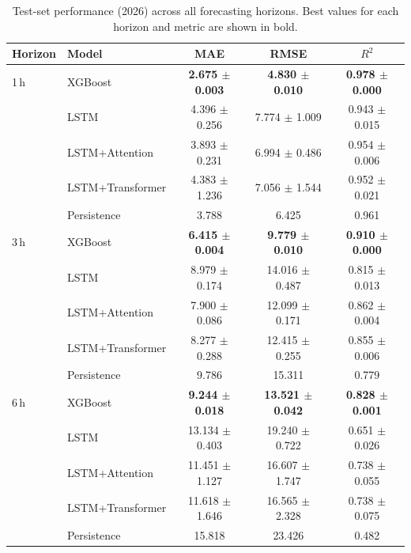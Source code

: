 \documentclass[conference]{IEEEtran}
\begin{document}
\begin{table}[t]
\caption{Test-set performance (2026) across all forecasting horizons. Best values for each horizon and metric are shown in bold.}
\label{tab:main}
\centering
\footnotesize
\setlength{\tabcolsep}{5pt}
\begin{tabular}{llccc}
\toprule
Horizon & Model & MAE & RMSE & \(R^2\) \\
\midrule

1\,h & XGBoost &
\textbf{2.675 \(\pm\) 0.003} &
\textbf{4.830 \(\pm\) 0.010} &
\textbf{0.978 \(\pm\) 0.000} \\

& LSTM &
4.396 \(\pm\) 0.256 &
7.774 \(\pm\) 1.009 &
0.943 \(\pm\) 0.015 \\

& LSTM+Attention &
3.893 \(\pm\) 0.231 &
6.994 \(\pm\) 0.486 &
0.954 \(\pm\) 0.006 \\

& LSTM+Transformer &
4.383 \(\pm\) 1.236 &
7.056 \(\pm\) 1.544 &
0.952 \(\pm\) 0.021 \\

& Persistence &
3.788 & 6.425 & 0.961 \\

\midrule

3\,h & XGBoost &
\textbf{6.415 \(\pm\) 0.004} &
\textbf{9.779 \(\pm\) 0.010} &
\textbf{0.910 \(\pm\) 0.000} \\

& LSTM &
8.979 \(\pm\) 0.174 &
14.016 \(\pm\) 0.487 &
0.815 \(\pm\) 0.013 \\

& LSTM+Attention &
7.900 \(\pm\) 0.086 &
12.099 \(\pm\) 0.171 &
0.862 \(\pm\) 0.004 \\

& LSTM+Transformer &
8.277 \(\pm\) 0.288 &
12.415 \(\pm\) 0.255 &
0.855 \(\pm\) 0.006 \\

& Persistence &
9.786 & 15.311 & 0.779 \\

\midrule

6\,h & XGBoost &
\textbf{9.244 \(\pm\) 0.018} &
\textbf{13.521 \(\pm\) 0.042} &
\textbf{0.828 \(\pm\) 0.001} \\

& LSTM &
13.134 \(\pm\) 0.403 &
19.240 \(\pm\) 0.722 &
0.651 \(\pm\) 0.026 \\

& LSTM+Attention &
11.451 \(\pm\) 1.127 &
16.607 \(\pm\) 1.747 &
0.738 \(\pm\) 0.055 \\

& LSTM+Transformer &
11.618 \(\pm\) 1.646 &
16.565 \(\pm\) 2.328 &
0.738 \(\pm\) 0.075 \\

& Persistence &
15.818 & 23.426 & 0.482 \\

\bottomrule
\end{tabular}
\end{table}
\end{document}
